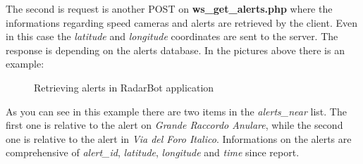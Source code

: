 			The second is request is another POST on \textbf{ws\_get\_alerts.php} where the informations regarding speed cameras and alerts are retrieved by the client. Even in this case the \textit{latitude} and \textit{longitude} coordinates are sent to the server. The response is depending on the alerts database. In the pictures above there is an example:
			\begin{figure}[ht]
				\centering
				\caption{Retrieving alerts in RadarBot application}
				\label{radarbot_alert}
			\end{figure}
			\par As you can see in this example there are two items in the \textit{alerts\_near} list. The first one is relative to the alert on \textit{Grande Raccordo Anulare}, while the second one is relative to the alert in \textit{Via del Foro Italico}. Informations on the alerts are comprehensive of \textit{alert\_id}, \textit{latitude}, \textit{longitude} and \textit{time} since report.\newline
			
